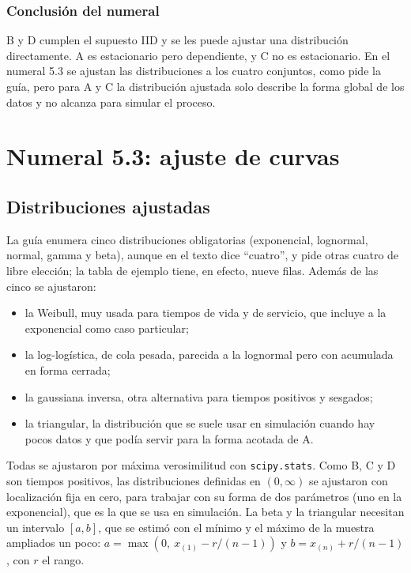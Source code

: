 \documentclass[11pt,letterpaper]{article}
\begin{document}
\subsubsection*{Conclusión del numeral}

B y D cumplen el supuesto IID y se les puede ajustar una distribución directamente. A es estacionario pero
dependiente, y C no es estacionario. En el numeral 5.3 se ajustan las distribuciones a los cuatro conjuntos, como
pide la guía, pero para A y C la distribución ajustada solo describe la forma global de los datos y no alcanza para
simular el proceso.

\section{Numeral 5.3: ajuste de curvas}

\subsection{Distribuciones ajustadas}

La guía enumera cinco distribuciones obligatorias (exponencial, lognormal, normal, gamma y beta), aunque en el texto
dice ``cuatro'', y pide otras cuatro de libre elección; la tabla de ejemplo tiene, en efecto, nueve filas. Además de
las cinco se ajustaron:

\begin{itemize}[itemsep=1pt]
\item la Weibull, muy usada para tiempos de vida y de servicio, que incluye a la exponencial como caso particular;
\item la log-logística, de cola pesada, parecida a la lognormal pero con acumulada en forma cerrada;
\item la gaussiana inversa, otra alternativa para tiempos positivos y sesgados;
\item la triangular, la distribución que se suele usar en simulación cuando hay pocos datos y que podía servir para
la forma acotada de A.
\end{itemize}

Todas se ajustaron por máxima verosimilitud con \texttt{scipy.stats}. Como B, C y D son tiempos positivos, las
distribuciones definidas en $(0, \infty)$ se ajustaron con localización fija en cero, para trabajar con su forma de
dos parámetros (uno en la exponencial), que es la que se usa en simulación. La beta y la triangular necesitan un
intervalo $[a, b]$, que se estimó con el mínimo y el máximo de la muestra ampliados un poco:
$a = \max(0,\ x_{(1)} - r/(n-1))$ y $b = x_{(n)} + r/(n-1)$, con $r$ el rango.
\end{document}

